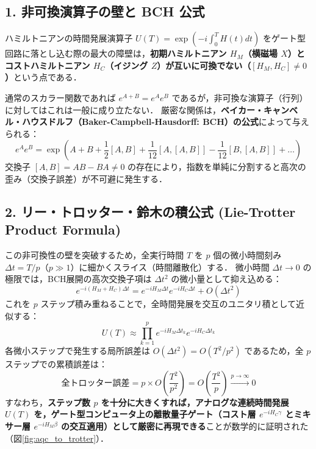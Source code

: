 \documentclass[11pt,a4paper,oneside,openany]{ltjsbook}
\theoremstyle{definition}
\theoremstyle{plain}
\theoremstyle{remark}
\begin{document}
\subsection{1. 非可換演算子の壁と BCH 公式}
ハミルトニアンの時間発展演算子 $U(T) = \exp\left(-i \int_0^T H(t) dt\right)$ をゲート型回路に落とし込む際の最大の障壁は，\textbf{初期ハミルトニアン $H_M$（横磁場 $X$）とコストハミルトニアン $H_C$（イジング $Z$）が互いに可換でない（$[H_M, H_C] \neq 0$）}という点である．

通常のスカラー関数であれば $e^{A + B} = e^A e^B$ であるが，非可換な演算子（行列）に対してはこれは一般に成り立たない．
厳密な関係は，\textbf{ベイカー・キャンベル・ハウスドルフ（Baker-Campbell-Hausdorff: BCH）の公式}によって与えられる：
\begin{equation}
    e^A e^B = \exp\left( A + B + \frac{1}{2}[A, B] + \frac{1}{12}[A, [A, B]] - \frac{1}{12}[B, [A, B]] + \dots \right)
\end{equation}
交換子 $[A, B] = AB - BA \neq 0$ の存在により，指数を単純に分割すると高次の歪み（交換子誤差）が不可避に発生する．

\subsection{2. リー・トロッター・鈴木の積公式 (Lie-Trotter Product Formula)}
この非可換性の壁を突破するため，全実行時間 $T$ を $p$ 個の微小時間刻み $\Delta t = T / p$（$p \gg 1$）に細かくスライス（時間離散化）する．
微小時間 $\Delta t \to 0$ の極限では，BCH展開の高次交換子項は $\Delta t^2$ の微小量として抑え込める：
\begin{equation}
    e^{-i (H_M + H_C) \Delta t} = e^{-i H_M \Delta t} e^{-i H_C \Delta t} + O(\Delta t^2)
\end{equation}
これを $p$ ステップ積み重ねることで，全時間発展を交互のユニタリ積として近似する：
\begin{equation}
    U(T) \approx \prod_{k=1}^p e^{-i H_M \Delta t_k} e^{-i H_C \Delta t_k}
\end{equation}
各微小ステップで発生する局所誤差は $O(\Delta t^2) = O(T^2 / p^2)$ であるため，全 $p$ ステップでの累積誤差は：
\begin{equation}
    \text{全トロッター誤差} = p \times O\left(\frac{T^2}{p^2}\right) = O\left(\frac{T^2}{p}\right) \xrightarrow{p \to \infty} 0
\end{equation}
すなわち，\textbf{ステップ数 $p$ を十分に大きくすれば，アナログな連続時間発展 $U(T)$ を，ゲート型コンピュータ上の離散量子ゲート（コスト層 $e^{-i H_C \gamma}$ とミキサー層 $e^{-i H_M \beta}$ の交互適用）として厳密に再現できる}ことが数学的に証明された（図\ref{fig:aqc_to_trotter}）．
\end{document}
